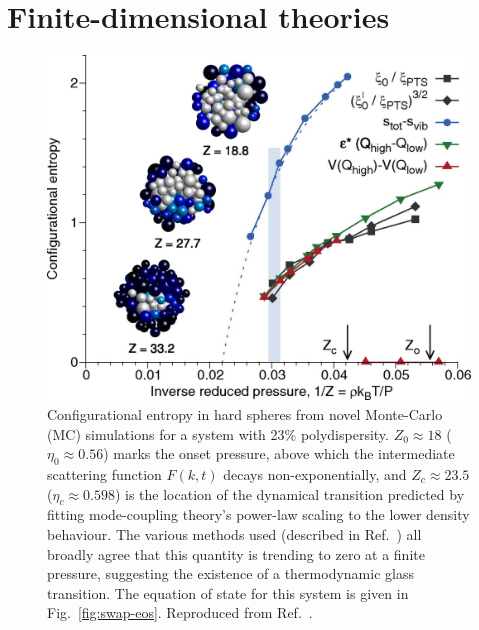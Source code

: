 \documentclass[11pt,twoside]{report}
\begin{document}
\section{Finite-dimensional theories}
\label{sec:finite-d-glass}

\begin{figure}
  \includegraphics[width=0.9\linewidth,outer]{swap-Sconf}
  \caption[Configurational entropy in hard spheres from Monte-Carlo simulations]{
    Configurational entropy in hard spheres from novel Monte-Carlo (MC) simulations for a system with 23\% polydispersity.
    $Z_0 \approx 18$ ($\eta_0 \approx 0.56$) marks the onset pressure, above which the intermediate scattering function $F(k,t)$ decays non-exponentially, and $Z_c \approx 23.5$ ($\eta_c \approx 0.598$) is the location of the dynamical transition predicted by fitting mode-coupling theory's power-law scaling to the lower density behaviour.
    The various methods used (described in Ref.\ \cite{BerthierPNAS2017}) all broadly agree that this quantity is trending to zero at a finite pressure, suggesting the existence of a thermodynamic glass transition.
    The equation of state for this system is given in Fig.\ \ref{fig:swap-eos}.
    Reproduced from Ref.\ \cite{BerthierPNAS2017}.
  }
  \label{fig:swap-sconf}
\end{figure}

\end{document}
